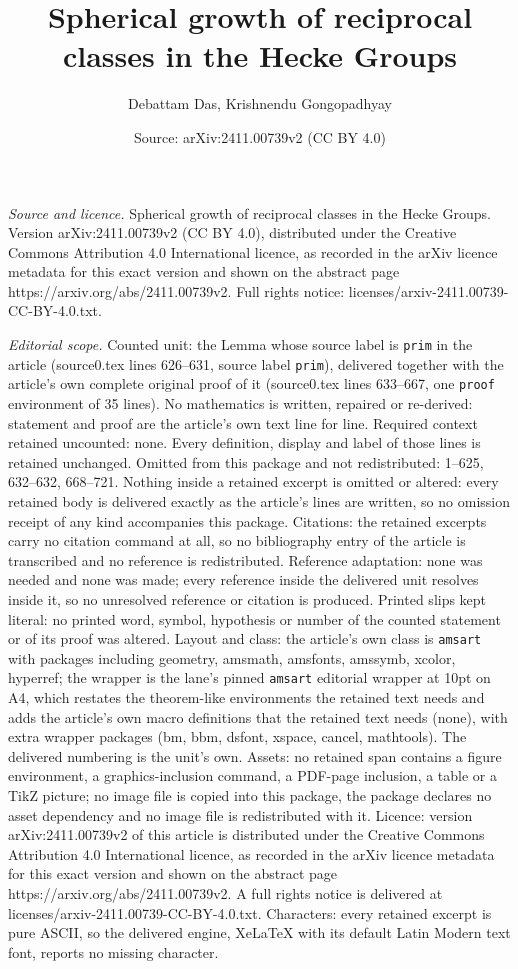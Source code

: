 \documentclass[10pt,a4paper]{amsart}
\title[Spherical growth of reciprocal classes in the Hecke Groups]{Spherical growth of reciprocal classes in the Hecke Groups}
\author{Debattam Das, Krishnendu Gongopadhyay}
\date{Source: arXiv:2411.00739v2 (CC BY 4.0)}
\begin{document}
\maketitle

\noindent\emph{Source and licence.} Spherical growth of reciprocal classes in the Hecke Groups. Version arXiv:2411.00739v2 (CC BY 4.0), distributed under the Creative Commons Attribution 4.0 International licence, as recorded in the arXiv licence metadata for this exact version and shown on the abstract page https://arxiv.org/abs/2411.00739v2. Full rights notice: licenses/arxiv-2411.00739-CC-BY-4.0.txt.\par\smallskip

\noindent\textit{Editorial scope.} Counted unit: the Lemma whose source label is \texttt{prim} in the article (source0.tex lines 626--631, source label \texttt{prim}), delivered together with the article's own complete original proof of it (source0.tex lines 633--667, one \texttt{proof} environment of 35 lines). No mathematics is written, repaired or re-derived: statement and proof are the article's own text line for line. Required context retained uncounted: none. Every definition, display and label of those lines is retained unchanged. Omitted from this package and not redistributed: 1--625, 632--632, 668--721. Nothing inside a retained excerpt is omitted or altered: every retained body is delivered exactly as the article's lines are written, so no omission receipt of any kind accompanies this package. Citations: the retained excerpts carry no citation command at all, so no bibliography entry of the article is transcribed and no reference is redistributed. Reference adaptation: none was needed and none was made; every reference inside the delivered unit resolves inside it, so no unresolved reference or citation is produced. Printed slips kept literal: no printed word, symbol, hypothesis or number of the counted statement or of its proof was altered. Layout and class: the article's own class is \texttt{amsart} with packages including geometry, amsmath, amsfonts, amssymb, xcolor, hyperref; the wrapper is the lane's pinned \texttt{amsart} editorial wrapper at 10pt on A4, which restates the theorem-like environments the retained text needs and adds the article's own macro definitions that the retained text needs (none), with extra wrapper packages (bm, bbm, dsfont, xspace, cancel, mathtools). The delivered numbering is the unit's own. Assets: no retained span contains a figure environment, a graphics-inclusion command, a PDF-page inclusion, a table or a TikZ picture; no image file is copied into this package, the package declares no asset dependency and no image file is redistributed with it. Licence: version arXiv:2411.00739v2 of this article is distributed under the Creative Commons Attribution 4.0 International licence, as recorded in the arXiv licence metadata for this exact version and shown on the abstract page https://arxiv.org/abs/2411.00739v2. A full rights notice is delivered at licenses/arxiv-2411.00739-CC-BY-4.0.txt. Characters: every retained excerpt is pure ASCII, so the delivered engine, XeLaTeX with its default Latin Modern text font, reports no missing character.
\end{document}
